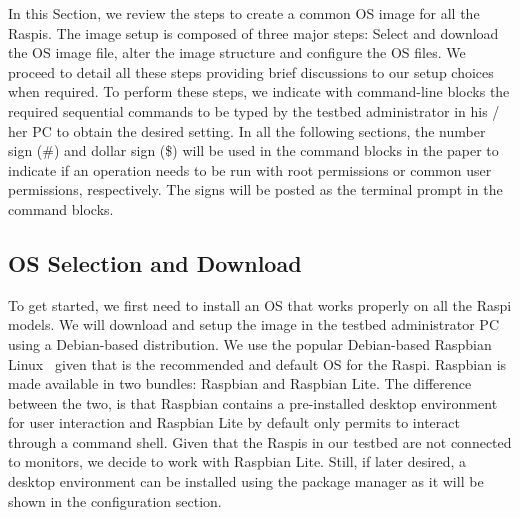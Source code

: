 \label{sec:image_setup}
In this Section, we review the steps to create a common \ac{OS} image for
all the \ac{Raspi}s. The image setup is composed of three major steps:
Select and download the \ac{OS} image file, alter the image structure and
configure the \ac{OS} files. We proceed to detail all these steps providing
brief discussions to our setup choices when required. To perform these
steps, we indicate with command-line blocks the required sequential
commands to be typed by the testbed administrator in his / her \ac{PC}
to obtain the desired setting. In all the following sections, the number
sign (\#) and dollar sign (\$) will be used in the command blocks in the
paper to indicate if an operation needs to be run with root permissions or
common user permissions, respectively. The signs will be posted as the
terminal prompt in the command blocks.

\subsection{OS Selection and Download}

To get started, we first need to install an \ac{OS} that works properly
on all the \ac{Raspi} models. We will download and setup the image in
the testbed administrator \ac{PC} using a Debian-based distribution. We
use the popular Debian-based Raspbian Linux~\cite{raspbian} given that is
the recommended and default \ac{OS} for the \ac{Raspi}. Raspbian is made
available in two bundles: Raspbian and Raspbian Lite. The difference
between the two, is that Raspbian contains a pre-installed desktop environment
for user interaction and Raspbian Lite by default only permits to interact
through a command shell. Given that the \ac{Raspi}s in our testbed are not
connected to monitors, we decide to work with Raspbian Lite. Still, if later
desired, a desktop environment can be installed using the package manager
as it will be shown in the configuration section.


